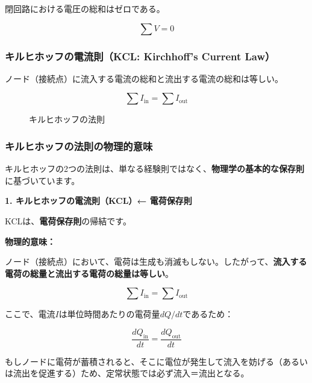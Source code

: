閉回路における電圧の総和はゼロである。

\begin{equation}
\sum V = 0
\end{equation}

\subsubsection{キルヒホッフの電流則（KCL: Kirchhoff's Current Law）}

ノード（接続点）に流入する電流の総和と流出する電流の総和は等しい。

\begin{equation}
\sum I_{\text{in}} = \sum I_{\text{out}}
\end{equation}

\begin{figure}[H]
\centering
{}
\caption{キルヒホッフの法則}
\label{fig:kirchhoff}
\end{figure}

\subsubsection{キルヒホッフの法則の物理的意味}

キルヒホッフの2つの法則は、単なる経験則ではなく、\textbf{物理学の基本的な保存則}に基づいています。

\textbf{1. キルヒホッフの電流則（KCL）← 電荷保存則}

KCLは、\textbf{電荷保存則}の帰結です。

\begin{screen}
\textbf{物理的意味：}

ノード（接続点）において、電荷は生成も消滅もしない。したがって、\textbf{流入する電荷の総量と流出する電荷の総量は等しい}。

\begin{equation}
\sum I_{\text{in}} = \sum I_{\text{out}}
\end{equation}

ここで、電流$I$は単位時間あたりの電荷量$dQ/dt$であるため：

\begin{equation}
\frac{dQ_{\text{in}}}{dt} = \frac{dQ_{\text{out}}}{dt}
\end{equation}

もしノードに電荷が蓄積されると、そこに電位が発生して流入を妨げる（あるいは流出を促進する）ため、定常状態では必ず流入＝流出となる。
\end{screen}

